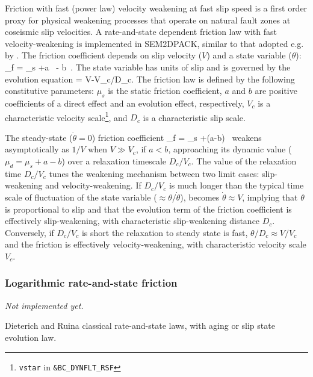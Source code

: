 Friction with fast (power law) velocity weakening at fast slip speed
is a first order proxy for physical weakening processes that operate
on natural fault zones at coseismic slip velocities.
A rate-and-state dependent friction law with fast velocity-weakening is implemented in SEM2DPACK,
similar to that adopted e.g. by .
The friction coefficient depends on slip velocity ($V$) and a state variable ($\theta$):
\eq
  \mu_f = \mu_s +a\  - b\ .
  \label{Eq:muf}
\en
The state variable has units of slip and is governed by the evolution equation
\eq
  \dot{\theta} = V-\theta V_c/D_c.
\label{Eq:th}
\en
The friction law is defined by the following constitutive parameters:
$\mu_s$ is the static friction coefficient,
$a$ and $b$ are positive coefficients of a direct effect and an evolution effect, respectively,
$V_c$ is a characteristic velocity scale\footnote{\texttt{vstar} in \texttt{\&BC\_DYNFLT\_RSF}},
and $D_c$ is a characteristic slip scale.

The steady-state ($\dot{\theta}=0$) friction coefficient 
\eq
  \mu_f = \mu_s +(a-b)\ 
\en
weakens asymptotically as $1/V$ when $V\gg V_c$,
if $a<b$, approaching its dynamic value ($\mu_d = \mu_s + a-b$)
over a relaxation timescale $D_c/V_c$.
The value of the relaxation time $D_c/V_c$ tunes the weakening mechanism between two limit cases:
slip-weakening and velocity-weakening.
If $D_c/V_c$ is much longer than the typical time scale of fluctuation of the
state variable ($\approx \theta/\dot{\theta}$),
 becomes $\dot{\theta} \approx V $,
implying that $\theta$ is proportional to slip
and that the evolution term of the friction coefficient
is effectively slip-weakening, with characteristic slip-weakening distance $D_c$.
Conversely, if $D_c/V_c$ is short the relaxation to steady state is fast,
$\theta/D_c \approx V/V_c$
and the friction is effectively velocity-weakening,
with characteristic velocity scale $V_c$.

\subsubsection{Logarithmic rate-and-state friction}
\emph{Not implemented yet.}

Dieterich and Ruina classical rate-and-state laws, with aging or slip state evolution law.
